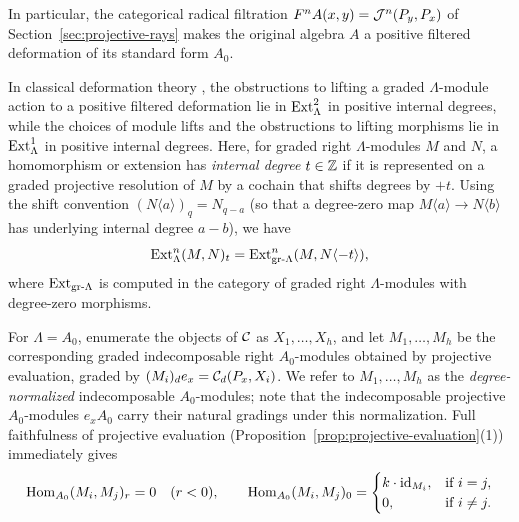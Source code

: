 In particular, the categorical radical filtration
$F^n A(x,y)=\mathcal J^n(P_y,P_x)$ of Section~\ref{sec:projective-rays} makes the
original algebra $A$ a positive filtered deformation of its standard form
$A_0$.

In classical deformation theory \cite{Gerstenhaber,Lowen}, the obstructions
to lifting a graded $\Lambda$-module action to a positive filtered
deformation lie in $\operatorname{Ext}^2_\Lambda$ in positive internal degrees, while the
choices of module lifts and the obstructions to lifting morphisms lie in
$\operatorname{Ext}^1_\Lambda$ in positive internal degrees. Here, for graded right
$\Lambda$-modules $M$ and $N$, a homomorphism or extension has
\emph{internal degree} $t\in\mathbb Z$ if it is represented on a graded projective
resolution of $M$ by a cochain that shifts degrees by $+t$. Using the shift
convention $(N\langle a\rangle)_q=N_{q-a}$ (so that a degree-zero map
$M\langle a\rangle\to N\langle b\rangle$ has underlying internal degree
$a-b$), we have
\[
 \operatorname{Ext}^n_\Lambda(M,N)_t
   =\operatorname{Ext}^n_{\mathrm{gr}\text{-}\Lambda}(M,N\langle-t\rangle),
\]
where $\operatorname{Ext}_{\mathrm{gr}\text{-}\Lambda}$ is computed in the category of
graded right $\Lambda$-modules with degree-zero morphisms.

For $\Lambda=A_0$, enumerate the objects of $\mathcal C$ as $X_1,\ldots,X_h$, and
let $M_1,\ldots,M_h$ be the corresponding graded indecomposable right
$A_0$-modules obtained by projective evaluation, graded by
$(M_i)_d e_x=\mathcal C_d(P_x,X_i)$. We refer to $M_1,\ldots,M_h$ as the
\emph{degree-normalized} indecomposable $A_0$-modules; note that the
indecomposable projective $A_0$-modules $e_x A_0$ carry their natural
gradings under this normalization. Full faithfulness of projective
evaluation (Proposition~\ref{prop:projective-evaluation}(1)) immediately
gives
\begin{equation}
 \operatorname{Hom}_{A_0}(M_i,M_j)_r=0\quad(r<0),\qquad
 \operatorname{Hom}_{A_0}(M_i,M_j)_0=
 \begin{cases}k\cdot\operatorname{id}_{M_i},&\text{if }i=j,\\0,&\text{if }i\ne j.\end{cases}
 \label{eq:normalized-hom-degrees}
\end{equation}

